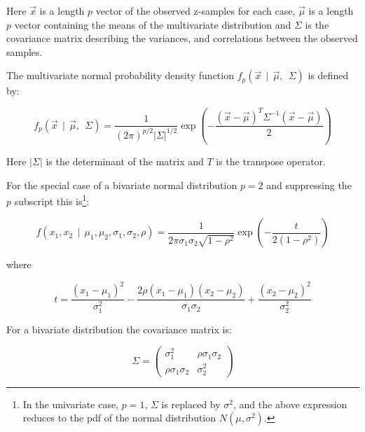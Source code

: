 \documentclass[
]{book}
\begin{document}
Here \(\overrightarrow{x}\) is a length \(p\) vector of the observed z-samples for each case, \(\overrightarrow{\mu}\) is a length \(p\) vector containing the means of the multivariate distribution and \(\Sigma\) is the covariance matrix describing the variances, and correlations between the observed samples.

The multivariate normal probability density function \(f_p\left( \overrightarrow{x} ~~ \bigg \rvert ~~\overrightarrow{\mu}, ~~ \Sigma \right)\) is defined by:

\begin{equation} 
f_p\left( \overrightarrow{x} ~~ \bigg \rvert ~~\overrightarrow{\mu}, ~~ \Sigma \right)
= \frac{1}{\left( 2 \pi \right)^{p/2}|\Sigma|^{1/2}}\exp\left( -\frac{\left( \overrightarrow{x}-\overrightarrow{\mu} \right)^T \Sigma^{-1} \left( \overrightarrow{x}-\overrightarrow{\mu} \right)}{2} \right)
\label{eq:bivariate-binormal-model-density-function-multivariate}
\end{equation}

Here \(|\Sigma|\) is the determinant of the matrix and \(T\) is the transpose operator.

For the special case of a bivariate normal distribution \(p = 2\) and suppressing the \(p\) subscript this is\footnote{In the univariate case, \(p = 1\), \(\Sigma\) is replaced by \(\sigma^2\), and the above expression reduces to the pdf of the normal distribution \(N(\mu, \sigma^2)\).}:

\begin{equation} 
f\left( x_1,x_2 ~~ \bigg \rvert ~~ \mu_1, \mu_2,  \sigma_1, \sigma_2, \rho \right)
= \frac{1}{2 \pi \sigma_1 \sigma_2 \sqrt{1-\rho^2}}\exp\left( -\frac{t}{2\left( 1-\rho^2 \right)} \right)
\label{eq:bivariate-binormal-model-density-function}
\end{equation}

where

\begin{equation} 
t=\frac{\left( x_1-\mu_1 \right)^2}{\sigma_1^2}-\frac{2\rho\left( x_1-\mu_1 \right)\left( x_2-\mu_2 \right)}{\sigma_1 \sigma_2}
+\frac{\left( x_2-\mu_2 \right)^2}{\sigma_2^2}
\label{eq:bivariate-binormal-model-density-function2}
\end{equation}

For a bivariate distribution the covariance matrix is:

\begin{equation} 
\Sigma=
\left( \begin{matrix}
\sigma_1^2 & \rho \sigma_1 \sigma_2 \\
\rho \sigma_1 \sigma_2 & 
\sigma_2^2
\end{matrix}
 \right)\label{eq:bivariate-binormal-model-covariance-matrix}
\end{equation}
\end{document}

